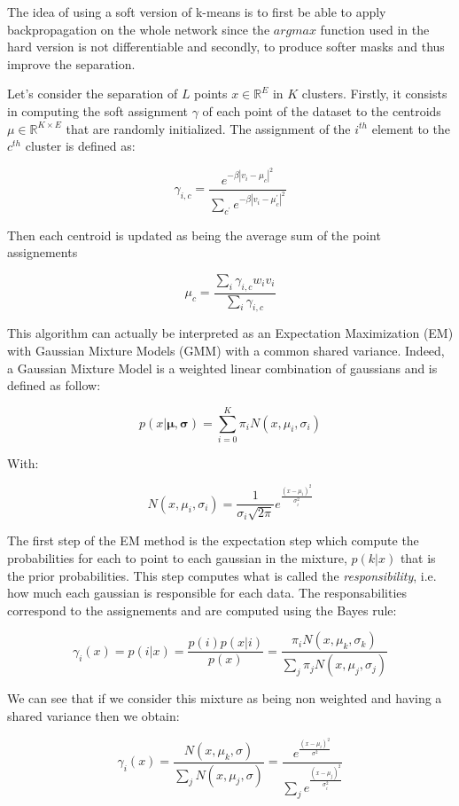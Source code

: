 \documentclass[master, tikz, final,11pt, dvipdfmx]{iscs-thesis}
\begin{document}
The idea of using a soft version of k-means is to first be able to apply backpropagation on the whole network since the $argmax$ function used in the hard version is not differentiable and secondly, to produce softer masks and thus improve the separation. 

Let's consider the separation of $L$ points $x \in \mathbb{R}^E$ in $K$ clusters. Firstly, it consists in computing the soft assignment $\gamma$ of each point of the dataset to the centroids $\mu \in \mathbb{R}^{K\times E}$ that are randomly initialized. The assignment of the $i^{th}$ element to the $c^{th}$ cluster is defined as:

\[ \gamma_{i,c} = \frac{e^{-\beta |v_i-\mu_c|^2}}{\sum_{c^\prime} e^{-\beta |v_i-\mu_c^\prime|^2}}  \]

Then each centroid is updated as being the average sum of the point assignements

\[ \mu_c = \frac{\sum_i \gamma_{i,c}w_iv_i}{\sum_i \gamma_{i,c}}  \]


This algorithm can actually be interpreted as an Expectation Maximization (EM) with Gaussian Mixture Models (GMM) with a common shared variance. Indeed, a Gaussian Mixture Model is a weighted linear combination of gaussians and is defined as follow:

\[
 p(x | \mathbf{\mu}, \mathbf{\sigma}) = \sum_{i=0}^K \pi_i N(x, \mu_i,\sigma_i)
\]

With:

\[
N(x, \mu_i,\sigma_i) = \frac{1}{\sigma_i \sqrt{2\pi}} e^{\frac{(x-\mu_i)^2}{\sigma_i^2}}
\]

The first step of the EM method is the expectation step which compute the probabilities for each to point to each gaussian in the mixture, $p(k|x)$ that is the prior probabilities. This step computes what is called the \textit{responsibility}, i.e. how much each gaussian is responsible for each data. The responsabilities correspond to the assignements and are computed using the Bayes rule:

\[
\gamma_i(x) = p(i|x) = \frac{p(i)p(x|i)}{p(x)} = \frac{\pi_i N(x, \mu_k,\sigma_k)}{\sum_j \pi_j N(x, \mu_j,\sigma_j)}
\]

We can see that if we consider this mixture as being non weighted and having a shared variance then we obtain:

\[
\gamma_i(x) = \frac{N(x, \mu_k,\sigma)}{\sum_j N(x, \mu_j,\sigma)} = \frac{e^{\frac{(x-\mu_i)^2}{\sigma^2}}}{\sum_j e^{\frac{(x-\mu_j)^2}{\sigma_i^2}}} 
\]
\end{document}
